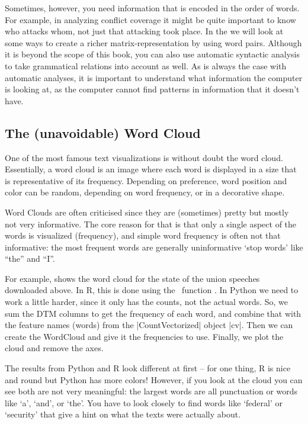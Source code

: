 Sometimes, however, you need information that is encoded in the order of words.
For example, in analyzing conflict coverage it might be quite important to know who attacks whom, not just that attacking took place.
In the  we will look at some ways to create a richer matrix-representation by using word pairs.
Although it is beyond the scope of this book,
you can also use automatic syntactic analysis to take grammatical relations into account as well.
As is always the case with automatic analyses, it is important to understand what information the computer is looking at,
as the computer cannot find patterns in information that it doesn't have.

\subsection{The (unavoidable) Word Cloud}

One of the most famous text visualizations is without doubt the word cloud.
Essentially, a word cloud is an image where each word is displayed in a size that is representative of its frequency.
Depending on preference, word position and color can be random, depending on word frequency, or in a decorative shape.

Word Clouds are often criticised since they are (sometimes) pretty but mostly not very informative.
The core reason for that is that only a single aspect of the words is visualized (frequency),
and simple word frequency is often not that informative: the most frequent words are generally uninformative `stop words' like ``the'' and ``I''.

For example,  shows the word cloud for the state of the union speeches downloaded above.
In R, this is done using the \quanteda\ function .
In Python we need to work a little harder, since it only has the counts, not the actual words.
So, we sum the DTM columns to get the frequency of each word, and combine that with the feature names (words)
from the |CountVectorized| object |cv|. Then we can create the WordCloud and give it the frequencies to use.
Finally, we plot the cloud and remove the axes.


The results from Python and R look different at first -- for one thing, R is nice and round but Python has more colors!
However, if you look at the cloud you can see both are not very meaningful: the largest words are all punctuation or words like
`a', `and', or `the'.
You have to look closely to find words like `federal' or `security' that give a hint on what the texts were actually about.


